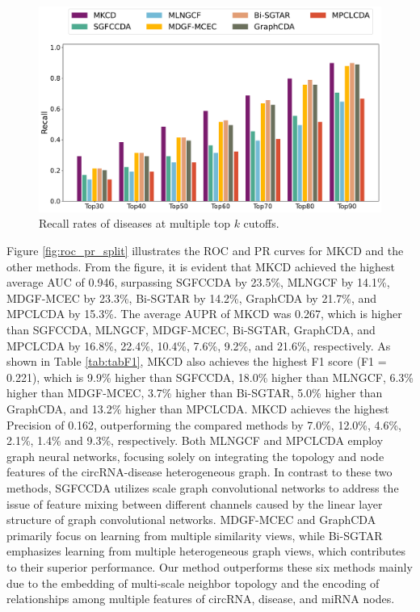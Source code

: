 \documentclass[journal,twoside,web]{ieeecolor}
\begin{document}
\begin{figure}[!t]
    \centering
    \includegraphics[width=5in]{fig/TopK_Recall.pdf}
     \caption{Recall rates of diseases at multiple top $k$ cutoffs.}
    \label{fig:topK}
	\vspace{-0.4cm}
\end{figure}

Figure \ref{fig:roc_pr_split} illustrates the ROC and PR curves for MKCD and the other methods. From the figure, it is evident that MKCD achieved the highest average AUC of 0.946, surpassing SGFCCDA by 23.5\%, MLNGCF by 14.1\%, MDGF-MCEC by 23.3\%, Bi-SGTAR by 14.2\%, GraphCDA by 21.7\%, and MPCLCDA by 15.3\%. The average AUPR of MKCD was 0.267, which is higher than SGFCCDA, MLNGCF, MDGF-MCEC, Bi-SGTAR, GraphCDA, and MPCLCDA by 16.8\%, 22.4\%, 10.4\%, 7.6\%, 9.2\%, and 21.6\%, respectively. 
As shown in Table \ref{tab:tabF1}, MKCD also achieves the highest F1 score (F1 = 0.221), which is 9.9\% higher than SGFCCDA, 18.0\% higher than MLNGCF, 6.3\% higher than MDGF-MCEC, 3.7\% higher than Bi-SGTAR, 5.0\% higher than GraphCDA, and 13.2\% higher than MPCLCDA. MKCD achieves the highest Precision of 0.162, outperforming the compared methods by 7.0\%, 12.0\%, 4.6\%, 2.1\%, 1.4\% and 9.3\%, respectively. %
Both MLNGCF and MPCLCDA employ graph neural networks, focusing solely on integrating the topology and node features of the circRNA-disease heterogeneous graph. In contrast to these two methods, SGFCCDA utilizes scale graph convolutional networks to address the issue of feature mixing between different channels caused by the linear layer structure of graph convolutional networks. MDGF-MCEC and GraphCDA primarily focus on learning from multiple similarity views, while Bi-SGTAR emphasizes learning from multiple heterogeneous graph views, which contributes to their superior performance. Our method outperforms these six methods mainly due to the embedding of multi-scale neighbor topology and the encoding of relationships among multiple features of circRNA, disease, and miRNA nodes.
\end{document}
